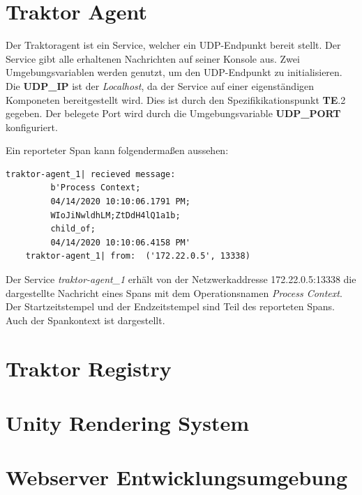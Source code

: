 \section{Traktor Agent}
\label{section:Traktor Agent}

Der Traktoragent ist ein Service, welcher ein UDP-Endpunkt bereit stellt. Der Service gibt alle erhaltenen Nachrichten auf seiner Konsole aus. Zwei Umgebungsvariablen werden genutzt, um den UDP-Endpunkt zu initialisieren. Die \textbf{UDP\_IP} ist der \emph{Localhost}, da der Service auf einer eigenständigen Komponeten bereitgestellt wird. Dies ist durch den Spezifikikationspunkt \textbf{TE}.2  gegeben. Der belegete Port wird durch die Umgebungsvariable \textbf{UDP\_PORT} konfiguriert. 

Ein reporteter Span kann folgendermaßen aussehen:

\begin{minipage}[]{\textwidth}
	\begin{lstlisting}[frame=trBL]
	traktor-agent_1| recieved message: 
		 b'Process Context;
		 04/14/2020 10:10:06.1791 PM;
		 WIoJiNwldhLM;ZtDdH4lQ1a1b;
		 child_of;
		 04/14/2020 10:10:06.4158 PM'
	traktor-agent_1| from:  ('172.22.0.5', 13338)
	\end{lstlisting}
	\label{listing:Reporteter-Span}
\end{minipage} 

Der Service \emph{traktor-agent\_1} erhält von der Netzwerkaddresse 172.22.0.5:13338 die dargestellte Nachricht eines Spans mit dem Operationsnamen \emph{Process Context}. Der Startzeitstempel und der Endzeitstempel sind Teil des reporteten Spans. Auch der Spankontext ist dargestellt.

\section{Traktor Registry}
\label{section:Traktor Registry}


\section{Unity Rendering System}
\label{section:Unity Rendering System}
\section{ Webserver Entwicklungsumgebung }
\label{section:Webserver Entwicklungsumgebung}
